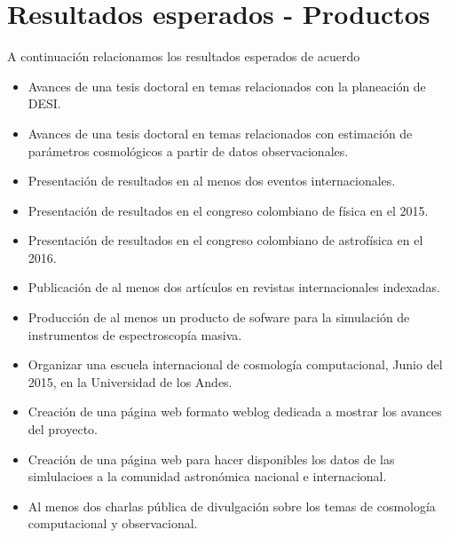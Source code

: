 
\section{Resultados esperados - Productos}


A continuaci\'on relacionamos los resultados esperados de acuerdo  

\begin{itemize}
\item Avances de una tesis doctoral en temas relacionados con la
  planeaci\'on de DESI. 

\item Avances de una tesis doctoral en temas relacionados con
  estimaci\'on de par\'ametros cosmol\'ogicos a partir de datos
  observacionales. 

\item Presentaci\'on de resultados en al menos dos eventos
  internacionales.  

\item Presentaci\'on de resultados en el congreso colombiano de
  f\'isica en el 2015.   

\item Presentaci\'on de resultados en el congreso colombiano de
  astrof\'isica en el 2016.  

\item Publicaci\'on de al menos dos art\'iculos en revistas
  internacionales indexadas. 

\item Producci\'on de al menos un producto de sofware para la
  simulaci\'on de instrumentos de espectroscop\'ia masiva.  

\item Organizar una escuela internacional de cosmolog\'ia
  computacional, Junio del 2015, en la Universidad de los Andes.  

\item Creaci\'on de una p\'agina web formato weblog dedicada a mostrar
  los avances del proyecto. 

\item Creaci\'on de una p\'agina web para hacer disponibles los datos
  de las simlulacioes a la comunidad astron\'omica nacional e
  internacional. 

\item Al menos dos charlas p\'ublica de divulgaci\'on sobre los temas
  de cosmolog\'ia computacional y observacional. 



\end{itemize}
